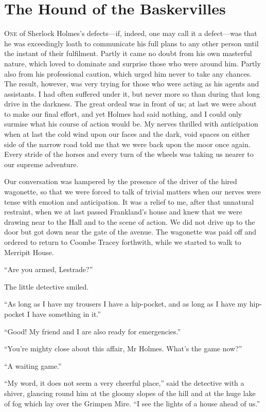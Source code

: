 \documentclass[paper=a5,BCOR=7mm,twoside,DIV=calc,12pt,usegeometry,openany,chapterprefix,endperiod,headings=big]{scrbook} %
\begin{document}
\chapter{The Hound of the Baskervilles}
\lettrine[lines=1]{O}{ne} of Sherlock Holmes's defects---if, indeed, one may call it a defect---was that he was exceedingly loath to communicate his full plans to any other person until the instant of their fulfilment. Partly it came no doubt from his own masterful nature, which loved to dominate and surprise those who were around him. Partly also from his professional caution, which urged him never to take any chances. The result, however, was very trying for those who were acting as his agents and assistants. I had often suffered under it, but never more so than during that long drive in the darkness. The great ordeal was in front of us; at last we were about to make our final effort, and yet Holmes had said nothing, and I could only surmise what his course of action would be. My nerves thrilled with anticipation when at last the cold wind upon our faces and the dark, void spaces on either side of the narrow road told me that we were back upon the moor once again. Every stride of the horses and every turn of the wheels was taking us nearer to our supreme adventure.

Our conversation was hampered by the presence of the driver of the hired wagonette, so that we were forced to talk of trivial matters when our nerves were tense with emotion and anticipation. It was a relief to me, after that unnatural restraint, when we at last passed Frankland's house and knew that we were drawing near to the Hall and to the scene of action. We did not drive up to the door but got down near the gate of the avenue. The wagonette was paid off and ordered to return to Coombe Tracey forthwith, while we started to walk to Merripit House.

\enquote{Are you armed, Lestrade?}

The little detective smiled.

\enquote{As long as I have my trousers I have a hip-pocket, and as long as I have my hip-pocket I have something in it.}

\enquote{Good! My friend and I are also ready for emergencies.}

\enquote{You're mighty close about this affair, Mr Holmes. What's the game now?}

\enquote{A waiting game.}

\enquote{My word, it does not seem a very cheerful place,} said the detective with a shiver, glancing round him at the gloomy slopes of the hill and at the huge lake of fog which lay over the Grimpen Mire. \enquote{I see the lights of a house ahead of us.}
\end{document}
